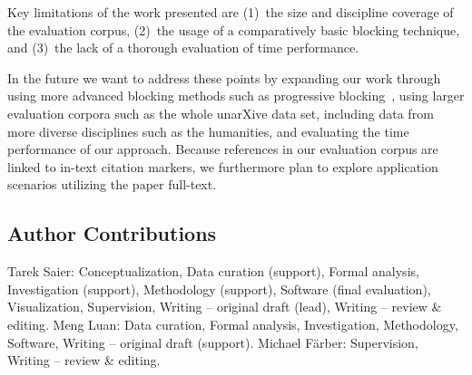 Key limitations of the work presented are (1)~the size and discipline coverage of the evaluation corpus, (2)~the usage of a comparatively basic blocking technique, and (3)~the lack of a thorough evaluation of time performance.

In the future we want to address these points by expanding our work through using more advanced blocking methods such as progressive blocking~\cite{Simonini2019,Galhotra2021}, using larger evaluation corpora such as the whole unarXive data set, including data from more diverse disciplines such as the humanities, and evaluating the time performance of our approach.
Because references in our evaluation corpus are linked to in-text citation markers, we furthermore plan to explore application scenarios utilizing the paper full-text. %


\subsection*{Author Contributions}  %
Tarek Saier: Conceptualization, Data curation (support), Formal analysis, Investigation (support), Methodology (support), Software (final evaluation), Visualization, Supervision, Writing -- original draft (lead), Writing -- review \& editing. Meng Luan: Data curation, Formal analysis, Investigation, Methodology, Software, Writing -- original draft (support). Michael F{\"a}rber: Supervision, Writing -- review \& editing.


